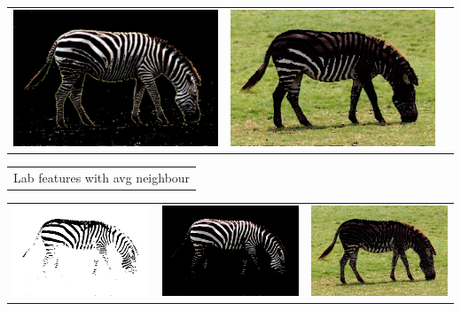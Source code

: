 \documentclass{article}
\begin{document}
\begin{center}
\begin{tabular}{c c c}
 \includegraphics[width=.4\linewidth]{../image-segmentation/output/add-Lab-neighbor-diff-feature/zebra_seg1.jpg} & \includegraphics[width=.4\linewidth]{../image-segmentation/output/add-Lab-neighbor-diff-feature/zebra_seg2.jpg} \\
  
 \end{tabular}
 \begin{tabular}{c}

Lab features with avg neighbour \\
\end{tabular}
 \begin{tabular}{c c c} 

 \includegraphics[width=.4\linewidth]{../image-segmentation/output/add-Lab-neighbor-avg-feature/zebra_mask.jpg} & 
 
 \includegraphics[width=.4\linewidth]{../image-segmentation/output/add-Lab-neighbor-avg-feature/zebra_seg1.jpg} & \includegraphics[width=.4\linewidth]{../image-segmentation/output/add-Lab-neighbor-avg-feature/zebra_seg2.jpg} \\
  
 \end{tabular}
 
 
\end{center}




%
\end{document}
